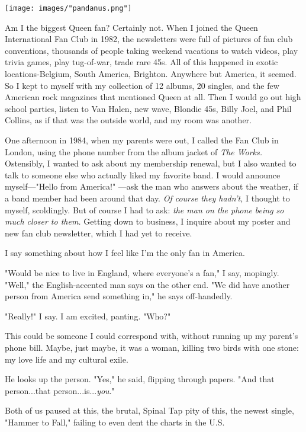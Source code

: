 \documentclass[
]{memoir}
\begin{document}
\begin{center}\texttt{[image: images/"pandanus.png"]}\end{center}

Am I the biggest Queen fan? Certainly not. When I joined the Queen
International Fan Club in 1982, the newsletters were full of pictures of
fan club conventions, thousands of people taking weekend vacations to
watch videos, play trivia games, play tug-of-war, trade rare 45s. All of
this happened in exotic locations-Belgium, South America, Brighton.
Anywhere but America, it seemed. So I kept to myself with my collection
of 12 albums, 20 singles, and the few American rock magazines that
mentioned Queen at all. Then I would go out high school parties, listen
to Van Halen, new wave, Blondie 45s, Billy Joel, and Phil Collins, as if
that was the outside world, and my room was another.

One afternoon in 1984, when my parents were out, I called the Fan Club
in London, using the phone number from the album jacket of \emph{The
Works.} Ostensibly, I wanted to ask about my membership renewal, but I
also wanted to talk to someone else who actually liked my favorite band.
I would announce myself---"Hello from America!" ---ask the man who
answers about the weather, if a band member had been around that day.
\emph{Of course they hadn't,} I thought to myself, scoldingly. But of
course I had to ask: \emph{the man on the phone being so much closer to
them.} Getting down to business, I inquire about my poster and new fan
club newsletter, which I had yet to receive.

I say something about how I feel like I'm the only fan in America.

"Would be nice to live in England, where everyone's a fan," I say,
mopingly. "Well," the English-accented man says on the other end. "We
did have another person from America send something in," he says
off-handedly.

"Really!" I say. I am excited, panting. "Who?"

This could be someone I could correspond with, without running up my
parent's phone bill. Maybe, just maybe, it was a woman, killing two
birds with one stone: my love life and my cultural exile.

He looks up the person. "Yes," he said, flipping through papers. "And
that person...that person...is...\emph{you}."

Both of us paused at this, the brutal, Spinal Tap pity of this, the
newest single, "Hammer to Fall," failing to even dent the charts in the
U.S.
\end{document}
